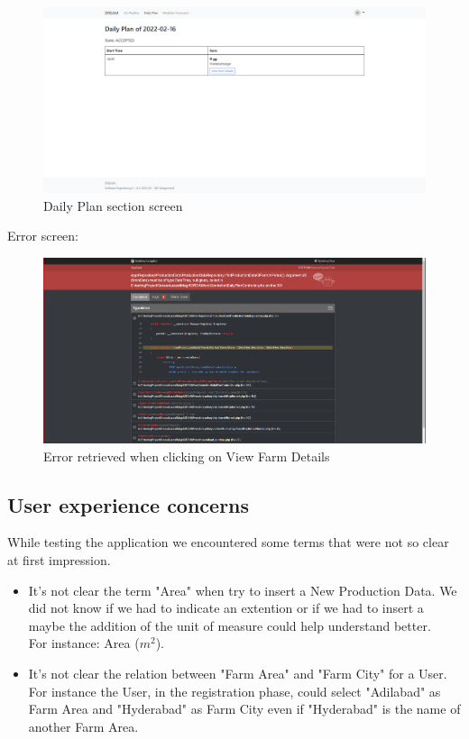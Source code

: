\begin{itemize}
\begin{figure}[h!]
        \centering
        \includegraphics[scale=0.25]{images/additional_notes/view_farm_details.png}
        \caption{Daily Plan section screen}
        \label{fig:my_label}
    \end{figure}
   \newpage
    Error screen:
    \begin{figure}[h!]
        \centering
        \includegraphics[scale=0.25]{images/additional_notes/view_datail_of_farm_to_visit_agronomist.png}
        \caption{Error retrieved when clicking on View Farm Details}
        \label{fig:my_label}
    \end{figure}
    \FloatBarrier
\end{itemize}


\subsection{User experience concerns}
While testing the application we encountered some terms that were not so clear at first impression.
\begin{itemize}
    \item It's not clear the term "Area" when try to insert a New Production Data. We did not know if we had to indicate an extention or if we had to insert a  maybe the addition of the unit of measure could help understand better.\\
    For instance: Area ($m^2$).
    \item It's not clear the relation between "Farm Area" and "Farm City" for a User. For instance the User, in the registration phase, could select "Adilabad" as Farm Area and "Hyderabad" as Farm City even if "Hyderabad" is the name of another Farm Area.
\end{itemize}